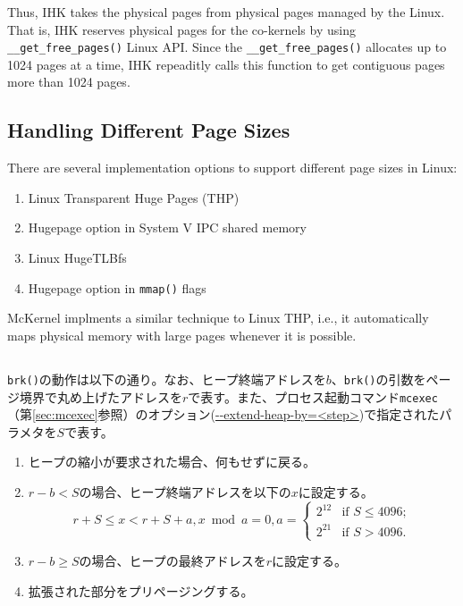 \documentclass[twoside,11pt,fleqn]{book}
\newcommand\textttw[1]{\mathchardef\UrlBreakPenalty=100\mathchardef\UrlBigBreakPenalty=100\url{#1}}
\begin{document}
Thus, IHK takes the physical pages from physical pages managed by the Linux.
That is, IHK reserves physical pages for the co-kernels
by using \texttt{\_\_get\_free\_pages()} Linux API.
Since the \texttt{\_\_get\_free\_pages()} allocates up to 1024 pages
at a time, IHK repeaditly calls this function to get
contiguous pages more than 1024 pages.

\subsection{Handling Different Page Sizes}

There are several implementation options to support different page sizes
in Linux:
\begin{enumerate}
\item Linux Transparent Huge Pages (THP)
\item Hugepage option in System V IPC shared memory
\item Linux HugeTLBfs
\item Hugepage option in \texttt{mmap()} flags
\end{enumerate}

McKernel implments a similar technique to Linux THP,
i.e., it automatically maps physical memory with large pages whenever it is
possible.

\subsection{}

\texttt{brk()}の動作は以下の通り。なお、ヒープ終端アドレスを$b$、\texttt{brk()}の引数をページ境界で丸め上げたアドレスを$r$で表す。また、プロセス起動コマンド\texttt{mcexec}（第\ref{sec:mcexec}参照）のオプション(\textttw{--extend-heap-by=<step>})で指定されたパラメタを$S$で表す。
\begin{enumerate}
\item ヒープの縮小が要求された場合、何もせずに戻る。
\item $r-b<S$の場合、ヒープ終端アドレスを以下の$x$に設定する。
$$
r+S{\leq}x<r+S+a, x \bmod a = 0,
a = \left\{ 
\begin{array}{ll}
2^{12} & \mbox{if $S \leq 4096$};\\
2^{21} & \mbox{if $S > 4096$}.
\end{array}
\right.$$
\item $r-b{\geq}S$の場合、ヒープの最終アドレスを$r$に設定する。
\item 拡張された部分をプリページングする。
\end{enumerate}
\end{document}
